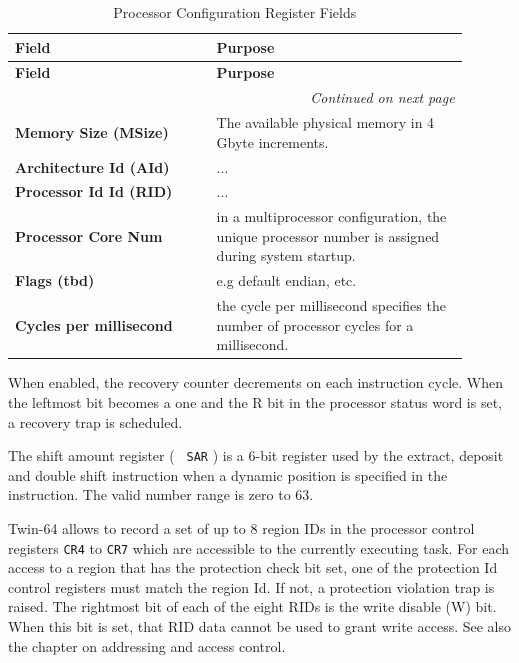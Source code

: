 \begin{longtable}{@{}p{0.4\linewidth}p{0.5\linewidth}@{}}
    \caption{Processor Configuration Register Fields} \\
    \toprule
    \textbf{Field} & \textbf{Purpose} \\
    \midrule
    \endfirsthead
    \toprule
    \textbf{Field} & \textbf{Purpose} \\
    \midrule
    \endhead
    \midrule
    \multicolumn{2}{r}{\textit{Continued on next page}} \\
    \midrule
    \endfoot
    \bottomrule
    \endlastfoot
    \textbf{Memory Size (MSize)} & The available physical memory in 4 Gbyte increments. \\
    \midrule
    \textbf{Architecture Id (AId) } & ... \\
    \midrule
    \textbf{Processor Id Id (RID) } & ... \\
    \midrule
    \textbf{Processor Core Num} & in a multiprocessor configuration, the unique processor number is assigned during system startup. \\
    \midrule
    \textbf{Flags (tbd) } & e.g default endian, etc. \\
    \midrule
    \textbf{Cycles per millisecond} & the cycle per millisecond specifies the number of processor cycles for a millisecond. \\
    \midrule
\end{longtable}



When enabled, the recovery counter decrements on each instruction cycle. When the leftmost bit becomes a one and the R bit in the processor status word is set, a recovery trap is scheduled.


The shift amount register ( \texttt{ SAR} ) is a 6-bit register used by the extract, deposit and double shift instruction when a dynamic position is specified in the instruction. The valid number range is zero to 63.


Twin-64 allows to record a set of up to 8 region IDs in the processor control registers \texttt{CR4} to \texttt{CR7} which are accessible to the currently executing task. For each access to a region that has the protection check bit set, one of the protection Id control registers must match the region Id. If not, a protection violation trap is raised. The rightmost bit of each of the eight RIDs is the write disable (W) bit. When this bit is set, that RID data cannot be used to grant write access. See also the chapter on addressing and access control.


